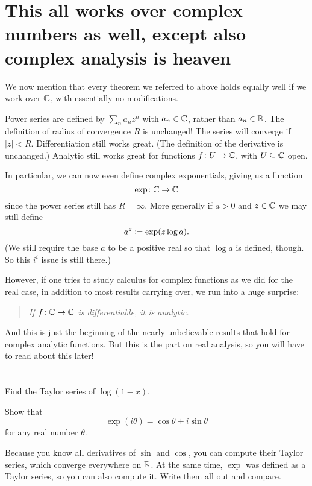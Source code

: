 \section{This all works over complex numbers as well,
except also complex analysis is heaven}
We now mention that every theorem we referred to above
holds equally well if we work over $\mathbb C$,
with essentially no modifications.
\begin{itemize}
	\ii Power series are defined by $\sum_n a_n z^n$ with $a_n \in \mathbb C$,
	rather than $a_n \in \mathbb R$.
	\ii The definition of radius of convergence $R$ is unchanged!
	The series will converge if $|z| < R$.
	\ii Differentiation still works great.
	(The definition of the derivative is unchanged.)
	\ii Analytic still works great for functions $f \colon U \to \mathbb C$, with $U \subseteq \mathbb C$ open.
\end{itemize}
In particular, we can now even define complex exponentials,
giving us a function \[ \exp \colon \mathbb C \to \mathbb C \]
since the power series still has $R = \infty$.
More generally if $a > 0$ and $z \in \mathbb C$
we may still define \[ a^z \coloneqq \exp(z \log a). \]
(We still require the base $a$ to be a positive real
so that $\log a$ is defined, though.
So this $i^i$ issue is still there.)

However, if one tries to study calculus for complex functions
as we did for the real case, in addition to most results carrying over, we run into a huge surprise:
\begin{quote}
	\itshape
	If $f \colon \mathbb C \to \mathbb C$ is differentiable,
	it is analytic.
\end{quote}
And this is just the beginning of the nearly unbelievable
results that hold for complex analytic functions.
But this is the part on real analysis, so you will have to read about this later!

\section{\problemhead}

\begin{problem}
	Find the Taylor series of $\log(1-x)$.
\end{problem}

\begin{dproblem}
	Show that \[ \exp(i \theta) = \cos \theta + i \sin \theta \]
	for any real number $\theta$.
	\begin{hint}
		Because you know all derivatives of $\sin$ and $\cos$,
		you can compute their Taylor series,
		which converge everywhere on $\mathbb R$.
		At the same time, $\exp$ was defined as a Taylor series,
		so you can also compute it.
		Write them all out and compare.
	\end{hint}
\end{dproblem}

